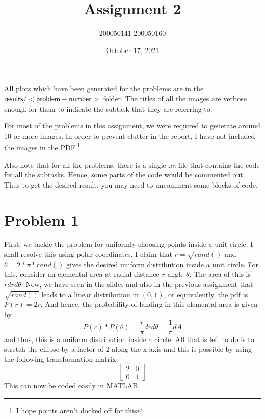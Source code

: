 \documentclass[12pt]{article}
\title{Assignment 2}
\author{200050141-200050160}
\date{October 17, 2021}
\begin{document}
	\maketitle 
	All plots which have been generated for the problems are in the $\mathsf{results/<problem-number>}$ folder. The titles of all the images are verbose enough for them to indicate the subtask that they are referring to. 

	For most of the problems in this assignment, we were required to generate around 10 or more images. In order to prevent clutter in the report, I have not included the images in the PDF.\footnote{I hope points aren't docked off for this}

	Also note that for all the problems, there is a single $\mathsf{.m}$ file that contains the code for all the subtasks. Hence, some parts of the code would be commented out. Thus to get the desired result, you may need to uncomment some blocks of code. 

	\newpage
	\section{Problem 1}
	First, we tackle the problem for uniformly choosing points inside a unit circle. I shall resolve this using polar coordinates. I claim that $r = \sqrt{rand()}$ and $\theta = 2 * \pi * rand()$ gives the desired uniform distribution inside a unit circle. For this, consider an elemental area at radial distance $r$ angle $\theta$. The area of this is $rdrd\theta$. Now, we have seen in the slides and also in the previous assignment that $\sqrt{rand()}$ leads to a linear distribution in $(0,1)$, or equivalently, the pdf is $P(r) = 2r$. And hence, the probability of landing in this elemental area is given by 
	\begin{equation*}
		P(r) * P(\theta) = \frac{r}{\pi} drd\theta = \frac{1}{\pi} dA 
	\end{equation*}
	and thus, this is a uniform distribution inside a circle. All that is left to do is to stretch the ellipse by a factor of 2 along the x-axis and this is possible by using the following transformation matrix:
	\begin{equation*}
		\begin{bmatrix}
			2 & 0\\
			0 & 1
		\end{bmatrix}
	\end{equation*}
	This can now be coded easily in MATLAB.
\end{document}
